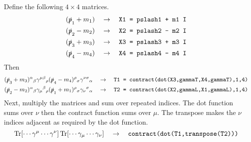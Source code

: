 \documentclass[12pt]{article}
\begin{document}
%
Define the following $4\times4$ matrices.
\begin{align*}
(\slashed{p}_1+m_1)\quad&\rightarrow\quad\text{\tt X1 = pslash1 + m1 I}\\
(\slashed{p}_2-m_2)\quad&\rightarrow\quad\text{\tt X2 = pslash2 - m2 I}\\
(\slashed{p}_3+m_3)\quad&\rightarrow\quad\text{\tt X3 = pslash3 + m3 I}\\
(\slashed{p}_4-m_4)\quad&\rightarrow\quad\text{\tt X4 = pslash4 - m4 I}
\end{align*}
%
Then
\begin{align*}
(\slashed{p}_3+m_3)^\alpha{}_\beta
\gamma^{\mu\beta}{}_\rho
(\slashed{p}_4-m_4)^\rho{}_\sigma
\gamma^{\nu\sigma}{}_\alpha
\quad&\rightarrow\quad
\text{\tt T1 = contract(dot(X3,gammaT,X4,gammaT),1,4)}
\\
(\slashed{p}_2-m_2)^\alpha{}_\beta
\gamma_\mu{}^\beta{}_\rho
(\slashed{p}_1+m_1)^\rho{}_\sigma
\gamma_\nu{}^\sigma{}_\alpha
\quad&\rightarrow\quad
\text{\tt T2 = contract(dot(X2,gammaL,X1,gammaL),1,4)}
\end{align*}
Next, multiply the matrices and sum over repeated indices.
The dot function sums over $\nu$ then the contract function
sums over $\mu$. The transpose makes the $\nu$ indices adjacent
as required by the dot function.
$$
\mathop{\rm Tr}[\cdots\gamma^\mu\cdots\gamma^\nu]\mathop{\rm Tr}[\cdots\gamma_\mu\cdots\gamma_\nu]
\quad\rightarrow\quad
\text{\tt contract(dot(T1,transpose(T2)))}
$$
\end{document}
